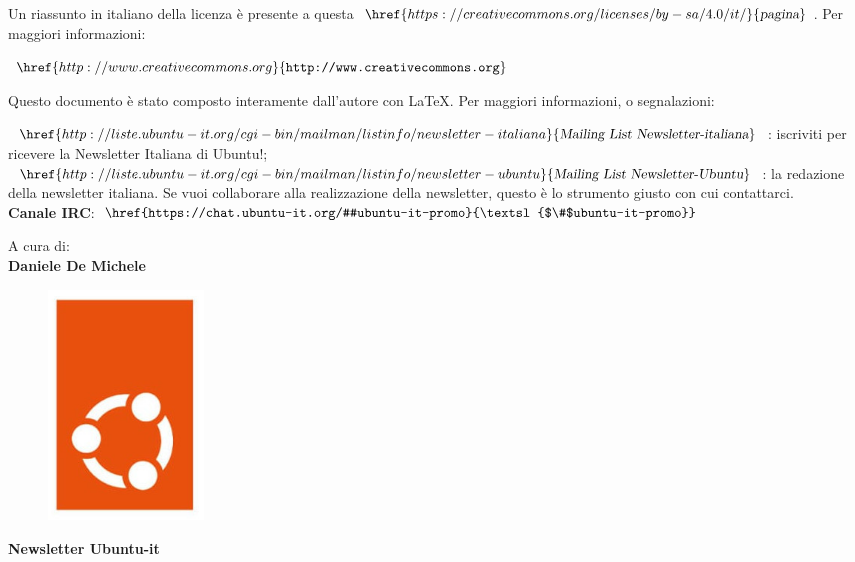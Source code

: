 \documentclass[a4paper,twoside]{article}
\begin{document}
Un riassunto in italiano della licenza è presente a questa $\href{https://creativecommons.org/licenses/by-sa/4.0/it/}{\textsl{pagina}}$. Per maggiori informazioni:

\begin{center}
$\href{http://www.creativecommons.org}{\texttt{http://www.creativecommons.org}}$
\end{center}

Questo documento è stato composto interamente dall'autore con \LaTeX. Per maggiori informazioni, o segnalazioni:

\begin{flushleft}
$\href{http://liste.ubuntu-it.org/cgi-bin/mailman/listinfo/newsletter-italiana}{\textsl{Mailing List Newsletter-italiana}}$: iscriviti per
ricevere la Newsletter Italiana di Ubuntu!;\\
$\href{http://liste.ubuntu-it.org/cgi-bin/mailman/listinfo/newsletter-ubuntu}{\textsl{Mailing List Newsletter-Ubuntu}}$: la redazione della newsletter italiana. Se vuoi collaborare alla realizzazione della newsletter, questo è lo strumento giusto con cui contattarci.\\
\textbf{Canale IRC}: $\href{https://chat.ubuntu-it.org/#ubuntu-it-promo}{\textsl{$\#$ubuntu-it-promo}}$
\end{flushleft}

\begin{flushright}
A cura di:\\
\textbf{Daniele De Michele}
\end{flushright}

\clearpage
\thispagestyle{empty}
\begin{figure}[!h]
\centering
\includegraphics[width=0.2\textwidth]{immagini/newlogo2.png}
\end{figure}
\begin{center}
\textbf{\Huge Newsletter Ubuntu-it}\vspace{\baselineskip}
\end{center}
\tableofcontents

\cleardoublepage
\end{document}
